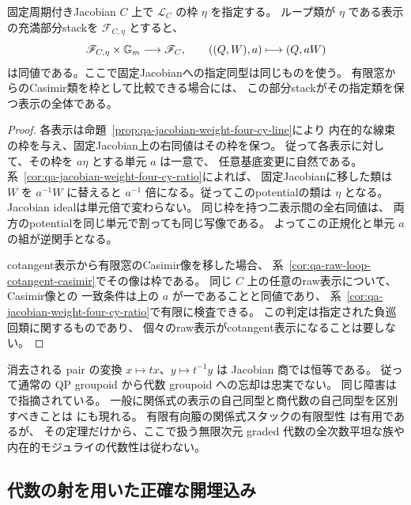 \begin{corollary}[負巡回直線の枠を指定した表示]
\label{cor:qa-jacobian-cy-normalized-presentations}
固定周期付きJacobian $C$ 上で $\mathscr L_C$ の枠 $\eta$ を指定する。
ループ類が $\eta$ である表示の充満部分stackを
$\mathscr F_{C,\eta}$ とすると、
\[
  \mathscr F_{C,\eta}\times\mathbb G_m\longrightarrow\mathscr F_C,
  \qquad ((Q,W),a)\longmapsto (Q,aW)
\]
は同値である。ここで固定Jacobianへの指定同型は同じものを使う。
有限窓からのCasimir類を枠として比較できる場合には、
この部分stackがその指定類を保つ表示の全体である。
\end{corollary}
\begin{proof}
各表示は命題~\ref{prop:qa-jacobian-weight-four-cy-line}により
内在的な線束の枠を与え、固定Jacobian上の右同値はその枠を保つ。
従って各表示に対して、その枠を $a\eta$ とする単元 $a$ は一意で、
任意基底変更に自然である。
系~\ref{cor:qa-jacobian-weight-four-cy-ratio}によれば、
固定Jacobianに移した類は $W$ を $a^{-1}W$ に替えると
$a^{-1}$ 倍になる。従ってこのpotentialの類は $\eta$ となる。
Jacobian idealは単元倍で変わらない。
同じ枠を持つ二表示間の全右同値は、
両方のpotentialを同じ単元で割っても同じ写像である。
よってこの正規化と単元 $a$ の組が逆関手となる。

cotangent表示から有限窓のCasimir像を移した場合、
系~\ref{cor:qa-raw-loop-cotangent-casimir}でその像は枠である。
同じ $C$ 上の任意のraw表示について、Casimir像との
一致条件は上の $a$ が一であることと同値であり、
系~\ref{cor:qa-jacobian-weight-four-cy-ratio}で有限に検査できる。
この判定は指定された負巡回類に関するものであり、
個々のraw表示がcotangent表示になることは要しない。
\end{proof}

\begin{remark}[表示を忘れる操作]
消去される pair の変換 $x\mapsto tx$、$y\mapsto t^{-1}y$ は
Jacobian 商では恒等である。
従って通常の QP groupoid から代数 groupoid への忘却は忠実でない。
同じ障害は \cite[Proposition 52.3]{AvatarVSeven2026} で指摘されている。
一般に関係式の表示の自己同型と商代数の自己同型を区別すべきことは
\cite[Proposition 3.3]{AOU2014} にも現れる。
有限有向箙の関係式スタックの有限型性
\cite[Definition 3.5, Proposition 3.6]{AOU2014} は有用であるが、
その定理だけから、ここで扱う無限次元 graded 代数の全次数平坦な族や
内在的モジュライの代数性は従わない。
\end{remark}

\subsection{代数の射を用いた正確な開埋込み}

